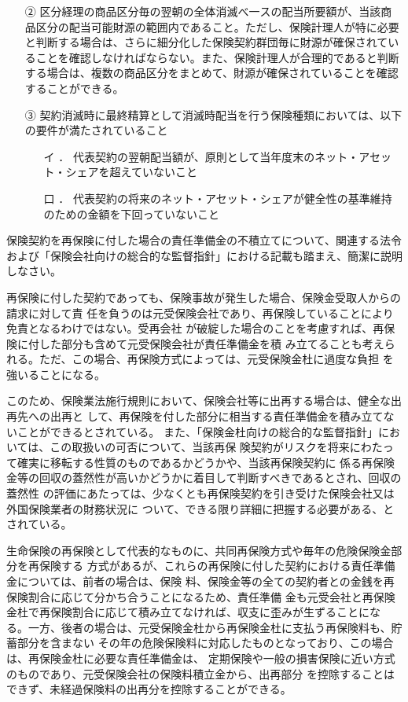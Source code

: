 \documentclass[report,gutter=10mm,fore-edge=10mm,uplatex,dvipdfmx]{jlreq}
\begin{document}
\begin{itemize}
\begin{itemize}
\begin{itemize}
\end{itemize}
\item[②] 区分経理の商品区分毎の翌朝の全体消滅べ一スの配当所要額が、当該商品区分の配当可能財源の範囲内であること。ただし、保険計理人が特に必要と判断する場合は、さらに細分化した保険契約群団毎に財源が確保されていることを確認しなければならない。また、保険計理人が合理的であると判断する場合は、複数の商品区分をまとめて、財源が確保されていることを確認することができる。
\item[③] 契約消滅時に最終精算として消滅時配当を行う保険種類においては、以下の要件が満たされていること
\begin{itemize}
\item[イ ．] 代表契約の翌朝配当額が、原則として当年度末のネット・アセット・シェアを超えていないこと
\item[口 ．] 代表契約の将来のネット・アセット・シェアが健全性の基準維持のための金額を下回っていないこと
\end{itemize}
\end{itemize}
\end{itemize}

保険契約を再保険に付した場合の責任準備金の不積立てについて、関連する法令および「保険会社向けの総合的な監督指針」における記載も踏まえ、簡潔に説明しなさい。

\answer{}
再保険に付した契約であっても、保険事故が発生した場合、保険金受取人からの請求に対して責
任を負うのは元受保険会社であり、再保険していることにより免責となるわけではない。受再会社
が破綻した場合のことを考慮すれば、再保険に付した部分も含めて元受保険会社が責任準備金を積
み立てることも考えられる。ただ、この場合、再保険方式によっては、元受保険金杜に過度な負担
を強いることになる。

このため、保険業法施行規則において、保険会社等に出再する場合は、健全な出再先への出再と
して、再保険を付した部分に相当する責任準備金を積み立てないことができるとされている。
また、「保険金杜向けの総合的な監督指針」においては、この取扱いの可否について、当該再保
険契約がリスクを将来にわたって確実に移転する性質のものであるかどうかや、当該再保険契約に
係る再保険金等の回収の蓋然性が高いかどうかに着目して判断すべきであるとされ、回収の蓋然性
の評価にあたっては、少なくとも再保険契約を引き受けた保険会社又は外国保険業者の財務状況に
ついて、できる限り詳細に把握する必要がある、とされている。

生命保険の再保険として代表的なものに、共同再保険方式や毎年の危険保険金部分を再保険する
方式があるが、これらの再保険に付した契約における責任準備金については、前者の場合は、保険
料、保険金等の全ての契約者との金銭を再保険割合に応じて分かち合うことになるため、責任準備
金も元受会社と再保険金杜で再保険割合に応じて積み立てなければ、収支に歪みが生ずることにな
る。一方、後者の場合は、元受保険金杜から再保険金杜に支払う再保険料も、貯蓄部分を含まない
その年の危険保険料に対応したものとなっており、この場合は、再保険金杜に必要な責任準備金は、
定期保険や一般の損害保険に近い方式のものであり、元受保険会社の保険料積立金から、出再部分
を控除することはできず、未経過保険料の出再分を控除することができる。
\end{document}
